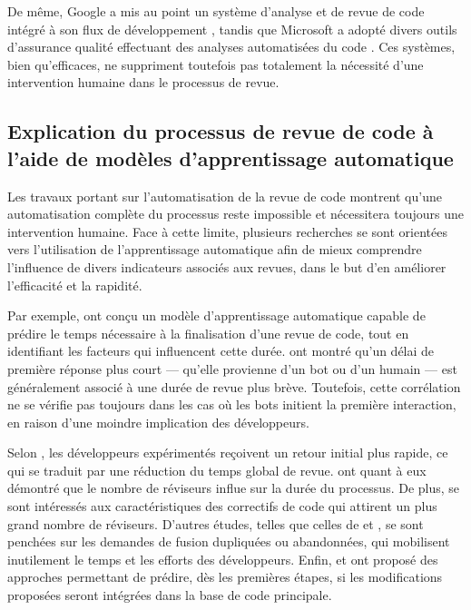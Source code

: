 De même, Google a mis au point un système d’analyse et de revue de code intégré à son flux de développement \cite{sadowski2015tricorder, potvin2016google}, tandis que Microsoft a adopté divers outils d’assurance qualité effectuant des analyses automatisées du code \cite{bird2015lessons}. Ces systèmes, bien qu’efficaces, ne suppriment toutefois pas totalement la nécessité d’une intervention humaine dans le processus de revue.

\subsection{Explication du processus de revue de code à l’aide de modèles d’apprentissage automatique}

Les travaux portant sur l’automatisation de la revue de code montrent qu’une automatisation complète du processus reste impossible et nécessitera toujours une intervention humaine. Face à cette limite, plusieurs recherches se sont orientées vers l’utilisation de l’apprentissage automatique afin de mieux comprendre l’influence de divers indicateurs associés aux revues, dans le but d’en améliorer l’efficacité et la rapidité.

Par exemple, \textcite{chouchen2023learning} ont conçu un modèle d’apprentissage automatique capable de prédire le temps nécessaire à la finalisation d’une revue de code, tout en identifiant les facteurs qui influencent cette durée. \textcite{hasan2023understanding} ont montré qu’un délai de première réponse plus court — qu’elle provienne d’un bot ou d’un humain — est généralement associé à une durée de revue plus brève. Toutefois, cette corrélation ne se vérifie pas toujours dans les cas où les bots initient la première interaction, en raison d’une moindre implication des développeurs.

Selon \textcite{bosu2014impact}, les développeurs expérimentés reçoivent un retour initial plus rapide, ce qui se traduit par une réduction du temps global de revue. \textcite{jiang2013will} ont quant à eux démontré que le nombre de réviseurs influe sur la durée du processus. De plus, \textcite{thongtanunam2017review} se sont intéressés aux caractéristiques des correctifs de code qui attirent un plus grand nombre de réviseurs.
D’autres études, telles que celles de \textcite{li2020redundancy} et \textcite{khatoonabadi2023wasted}, se sont penchées sur les demandes de fusion dupliquées ou abandonnées, qui mobilisent inutilement le temps et les efforts des développeurs. Enfin, \textcite{fan2018early} et \textcite{islam2022early} ont proposé des approches permettant de prédire, dès les premières étapes, si les modifications proposées seront intégrées dans la base de code principale.

